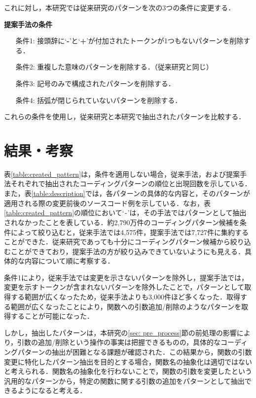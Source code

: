 \documentclass[11pt]{jreport}
\begin{document}
これに対し，本研究では従来研究のパターンを次の3つの条件に変更する．

\textbf{提案手法の条件}
\begin{itemize}
    \item[条件1: ] 接頭辞に`\textbf{-}'と`\textbf{+}'が付加されたトークンが1つもないパターンを削除する．
    \item[条件2: ] 重複した意味のパターンを削除する．（従来研究と同じ）
    \item[条件3: ] 記号のみで構成されたパターンを削除する．
    \item[条件4: ] 括弧が閉じられていないパターンを削除する．
\end{itemize}

これらの条件を使用し，従来研究と本研究で抽出されたパターンを比較する．

\section{結果・考察}
表\ref{table:created_pattern}は，条件を適用しない場合，従来手法，および提案手法それぞれで抽出されたコーディングパターンの順位と出現回数を示している．また，表\ref{table:description}では，各パターンの具体的な内容と，そのパターンが適用される際の変更前後のソースコード例を示している．なお，表\ref{table:created_pattern}の順位において`\texttt{-}'は，その手法ではパターンとして抽出されなかったことを表している．約2,790万件のコーディングパターン候補を条件によって絞り込むと，従来手法では4,575件，提案手法では7,727件に集約することができた．従来研究であっても十分にコーディングパターン候補から絞り込むことができており，提案手法の方が絞り込みできていないようにも見える．具体的な内容について順に考察する．

条件1により，従来手法では変更を示さないパターンを除外し，提案手法では，変更を示すトークンが含まれないパターンを除外したことで，パターンとして取得する範囲が広くなったため，従来手法よりも3,000件ほど多くなった．取得する範囲が広くなったことにより，関数への引数追加/削除のようなパターンを取得することが可能になった．

しかし，抽出したパターンは，本研究の\ref{sec: pre_process}節の前処理の影響により，引数の追加/削除という操作の事実は把握できるものの，具体的なコーディングパターンの抽出が困難となる課題が確認された．この結果から，関数の引数変更に特化したパターン抽出を目的とする場合，関数名の抽象化は適切ではないと考えられる．関数名の抽象化を行わないことで，関数の引数を変更したという汎用的なパターンから，特定の関数に関する引数の追加をパターンとして抽出できるようになると考える．
\end{document}
